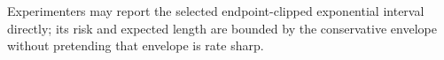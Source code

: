 Experimenters may report the selected endpoint-clipped exponential interval directly; its risk and expected length are bounded by the conservative envelope without pretending that envelope is rate sharp.
